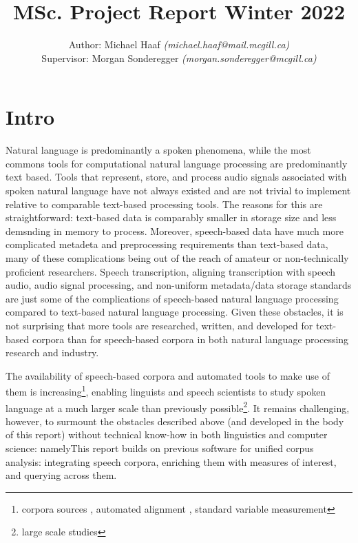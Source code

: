 \documentclass[11pt]{article}
\begin{document}
\title{MSc. Project Report Winter 2022}
\author{Author: Michael Haaf \textit{(michael.haaf@mail.mcgill.ca)} \\ Supervisor: Morgan Sonderegger \textit{(morgan.sonderegger@mcgill.ca)}}

\maketitle

\section{Intro}

\nocite{*}

Natural language is predominantly a spoken phenomena, while the most commons tools for computational natural language processing are predominantly text based. Tools that represent, store, and process audio signals associated with spoken natural language have not always existed and are not trivial to implement relative to comparable text-based processing tools. The reasons for this are straightforward: text-based data is comparably smaller in storage size and less demsnding in memory to process. Moreover, speech-based data have much more complicated metadeta and preprocessing requirements than text-based data, many of these complications being out of the reach of amateur or non-technically proficient researchers. Speech transcription, aligning transcription with speech audio, audio signal processing, and non-uniform metadata/data storage standards are just some of the complications of speech-based natural language processing compared to text-based natural language processing. Given these obstacles, it is not surprising that more tools are researched, written, and developed for text-based corpora than for speech-based corpora in both natural language processing research and industry.

The availability of speech-based corpora and automated tools to make use of them is increasing\footnote{corpora sources , automated alignment , standard variable measurement }, enabling linguists and speech scientists to study spoken language at a much larger scale than previously possible\footnote{large scale studies}. It remains challenging, however, to surmount the obstacles described above (and developed in the body of this report) without technical know-how in both linguistics and computer science: namelyThis report builds on previous software for unified corpus analysis: integrating speech corpora, enriching them with measures of interest, and querying across them.
\end{document}
